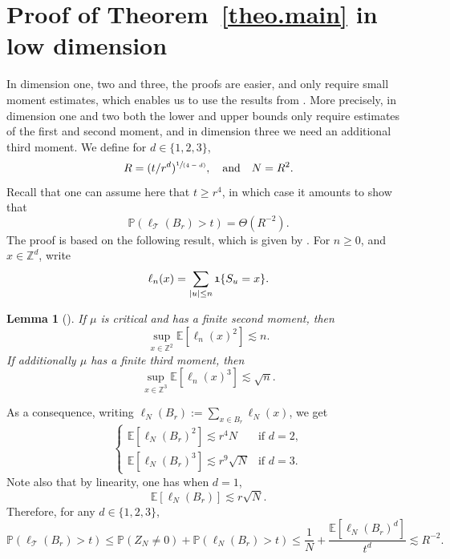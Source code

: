 \documentclass[11pt]{article}
\numberwithin{equation}{section}
\newcommand{\spfrac}[2]{\sfrac{#1}{(#2)}}
\theoremstyle{plain}
\newtheorem{lemma}[theorem]{Lemma}
\theoremstyle{definition}
\newcommand\T{\mathcal{T}}
\newcommand{\1}{{\text{\Large $\mathfrak 1$}}}
\begin{document}
\section{Proof of Theorem~\ref{theo.main} in low dimension}\label{sec-LD}
In dimension one, two and three, the proofs are easier, and only
require small moment estimates,
which enables us to use the results from \cite{AHJ}.
More precisely, in dimension one and two both the lower and upper bounds only require estimates of the
first and second moment,
and in dimension three we need an additional third moment. We define for $d\in \{1,2,3\}$,
\begin{equation*}
R = (t/r^d)^{\spfrac{1}{4-d}}, \quad \text{and}\quad N= R^2.
\end{equation*}
Recall that one can assume here that $t\ge r^4$, in which case it amounts to show that
\[
\mathbb P(\ell_\T(B_r) > t) = \Theta (R^{-2}).
\]
The proof is based on the following result, which is given by \cite[Lem.\,4.3]{AHJ}. For $n\ge 0$, and $x\in \mathbb Z^d$, write
\[
\ell_n(x) = \sum_{|u|\le n} \1\{S_u= x\}.
\]
\begin{lemma}[\cite{AHJ}] \label{lem.AHJ}
If $\mu$ is critical and has a finite second moment, then
\begin{equation*}
\sup_{x\in \mathbb Z^2} \mathbb E[\ell_n(x)^2] \lesssim n.
\end{equation*}
If additionally $\mu$ has a finite third moment, then
\[
\sup_{x\in \mathbb Z^3} \mathbb E[\ell_n(x)^3]\lesssim \sqrt n.
\]
\end{lemma}
As a consequence, writing $\ell_N(B_r):= \sum_{x\in B_r} \ell_N(x)$, we get
\[
\begin{cases}
\mathbb E[\ell_N(B_r)^2] \lesssim
r^4 N & \text{if }d=2, \\[5pt]
\mathbb E[\ell_N(B_r)^3]\lesssim r^9 \sqrt{N} & \text{if }d=3.
\end{cases}
\]
Note also that by linearity, one has when $d=1$,
\[
\mathbb E[\ell_N(B_r)] \lesssim r \sqrt N.
\]
Therefore, for any $d\in \{1,2,3\}$,
\[
\mathbb P(\ell_\T(B_r) >t ) \le \mathbb P(Z_N \neq 0) + \mathbb P(\ell_N(B_r) >t )\le \frac 1N + \frac { \mathbb E[\ell_N(B_r)^d]}{t^d}\lesssim R^{-2}.
\]
\end{document}
